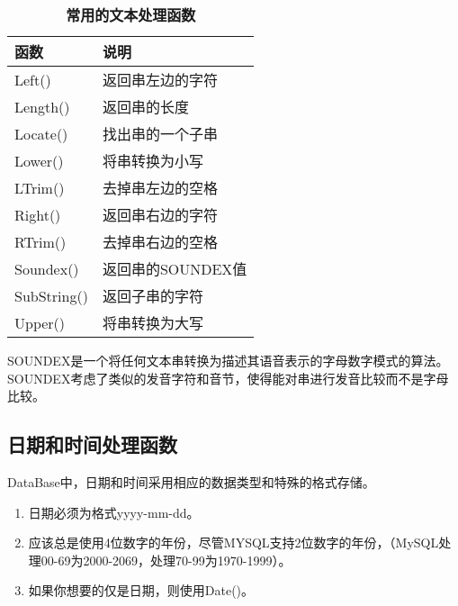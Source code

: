\documentclass[UTF8]{article}
\begin{document}
\begin{table}[H]
        \caption{\textbf{常用的文本处理函数}}%
        \centering%
        \begin{tabular}{ll}%
        \toprule%
        函数&说明\\
        \midrule%
        Left()&返回串左边的字符\\
        Length()&返回串的长度\\
        Locate()&找出串的一个子串\\
        Lower()&将串转换为小写\\
        LTrim()&去掉串左边的空格\\
        Right()&返回串右边的字符\\
        RTrim()&去掉串右边的空格\\
        Soundex()&返回串的SOUNDEX值\\
        SubString()&返回子串的字符\\
        Upper()&将串转换为大写\\
        \bottomrule%
        \end{tabular}
\end{table}  

\begin{orangebox}[frametitle={Tips 11.1.1 SOUNDEX}]
        SOUNDEX是一个将任何文本串转换为描述其语音表示的字母数字模式的算法。SOUNDEX考虑了类似的发音字符和音节，使得能对串进行发音比较而不是字母比较。    
\end{orangebox}

\subsection{日期和时间处理函数}

DataBase中，日期和时间采用相应的数据类型和特殊的格式存储。

\begin{orangebox}[frametitle={Tips 11.2.1 日期格式}]
        \begin{enumerate}
                \item 日期必须为格式yyyy-mm-dd。
                \item 应该总是使用4位数字的年份，尽管MYSQL支持2位数字的年份，（MySQL处理00-69为2000-2069，处理70-99为1970-1999）。
                \item 如果你想要的仅是日期，则使用Date()。
        \end{enumerate}       
\end{orangebox}
\end{document}
